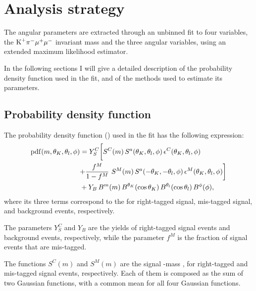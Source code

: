 \chapter{Analysis strategy} \label{sec:fit}

The angular parameters are extracted through an unbinned fit to four variables, the $\textrm{K}^{+}\pi^{-}\mu^{+}\mu^{-}$ invariant mass and the three angular variables, using an extended maximum likelihood estimator.

In the following sections I will give a detailed description of the probability density function used in the fit, and of the methods used to estimate its parameters.

\section{Probability density function}
\label{sec:TotalPDF}

The probability density function (\pdf) used in the fit has the following expression:
\begin{equation} \label{eq:angALL}
  \begin{split}
    \mathrm{pdf}(m,\theta_K,\theta_l,\phi) & = Y^{C}_{S} \biggl[ S^{C}(m)  \, S^a(\theta_K,\theta_l,\phi) \, \epsilon^{C}(\theta_K,\theta_l,\phi) \biggr. \\
      & \biggl. + \frac{f^{M}}{1-f^{M}}~S^{M}(m) \, S^a(-\theta_K,-\theta_l,\phi) \, \epsilon^{M}(\theta_K,\theta_l,\phi) \biggr] \\
    & + Y_{B}\,B^m(m) \, B^{\theta_K}(\cos\theta_K) \, B^{\theta_l}(\cos\theta_l) \, B^{\phi}(\phi), \\
  \end{split}
\end{equation}
where its three terms correspond to the \pdfs for right-tagged signal, mis-tagged signal, and background events, respectively.

The parameters $Y^{C}_{S}$ and $Y_{B}$ are the yields of right-tagged signal events and background events, respectively, while the parameter $f^{M}$ is the fraction of signal events that are mis-tagged.

The functions $S^{C}(m)$ and $S^{M}(m)$ are the signal \PBz-mass \pdfs, for right-tagged and mis-tagged signal events, respectively.
Each of them is composed as the sum of two Gaussian functions, with a common mean for all four Gaussian functions.

